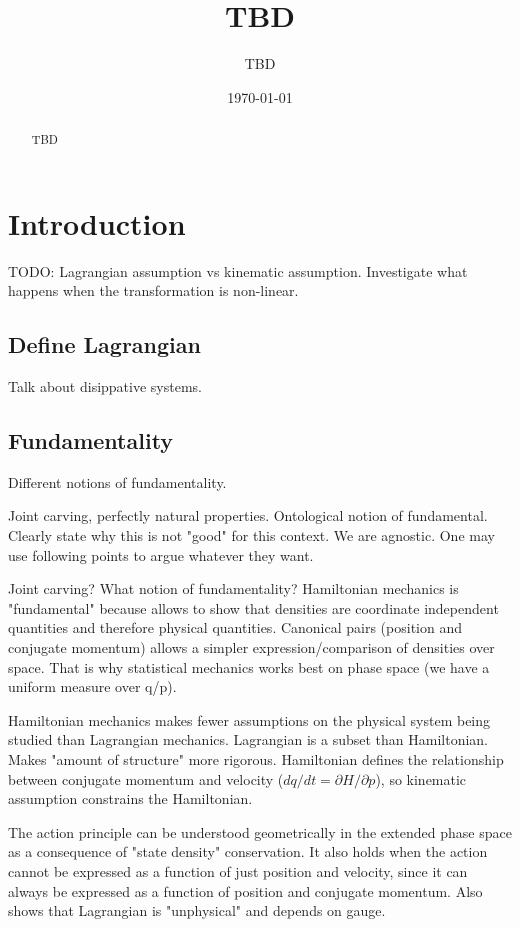 \documentclass[letterpaper]{article}
\begin{document}
\title{TBD}
\author{TBD}

\date{\today}

\maketitle

\begin{abstract}
	TBD
\end{abstract}


\section{Introduction}


TODO: Lagrangian assumption vs kinematic assumption. Investigate what happens when the transformation is non-linear.

\subsection{Define Lagrangian}

Talk about disippative systems.

\subsection{Fundamentality}

Different notions of fundamentality.

Joint carving, perfectly natural properties. Ontological notion of fundamental. Clearly state why this is not "good" for this context. We are agnostic. One may use following points to argue whatever they want.

Joint carving? What notion of fundamentality? Hamiltonian mechanics is "fundamental" because allows to show that densities are coordinate independent quantities and therefore physical quantities. Canonical pairs (position and conjugate momentum) allows a simpler expression/comparison of densities over space. That is why statistical mechanics works best on phase space (we have a uniform measure over q/p).

Hamiltonian mechanics makes fewer assumptions on the physical system being studied than Lagrangian mechanics. Lagrangian is a subset than Hamiltonian. Makes "amount of structure" more rigorous. Hamiltonian defines the relationship between conjugate momentum and velocity ($dq/dt = \partial H / \partial p$), so kinematic assumption constrains the Hamiltonian.

The action principle can be understood geometrically in the extended phase space as a consequence of "state density" conservation. It also holds when the action cannot be expressed as a function of just position and velocity, since it can always be expressed as a function of position and conjugate momentum. Also shows that Lagrangian is "unphysical" and depends on gauge.
 




\end{document}
